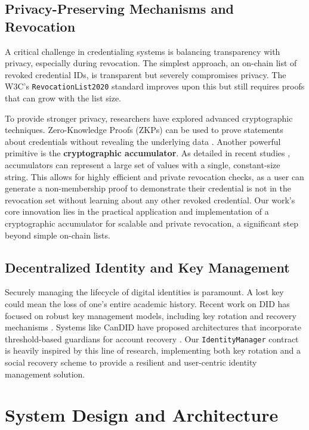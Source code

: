 \documentclass[lettersize,journal]{IEEEtran}
\begin{document}
\subsection{Privacy-Preserving Mechanisms and Revocation}
A critical challenge in credentialing systems is balancing transparency with privacy, especially during revocation. The simplest approach, an on-chain list of revoked credential IDs, is transparent but severely compromises privacy. The W3C's \texttt{RevocationList2020} standard \cite{RevocationList2020} improves upon this but still requires proofs that can grow with the list size.

To provide stronger privacy, researchers have explored advanced cryptographic techniques. Zero-Knowledge Proofs (ZKPs) can be used to prove statements about credentials without revealing the underlying data \cite{ZKP2023}. Another powerful primitive is the \textbf{cryptographic accumulator}. As detailed in recent studies \cite{AccumulatorCrypto2024}, accumulators can represent a large set of values with a single, constant-size string. This allows for highly efficient and private revocation checks, as a user can generate a non-membership proof to demonstrate their credential is not in the revocation set without learning about any other revoked credential. Our work's core innovation lies in the practical application and implementation of a cryptographic accumulator for scalable and private revocation, a significant step beyond simple on-chain lists.

\subsection{Decentralized Identity and Key Management}
Securely managing the lifecycle of digital identities is paramount. A lost key could mean the loss of one's entire academic history. Recent work on DID has focused on robust key management models, including key rotation and recovery mechanisms \cite{KeyManagement2024}. Systems like CanDID have proposed architectures that incorporate threshold-based guardians for account recovery \cite{CanDID2021}. Our \texttt{IdentityManager} contract is heavily inspired by this line of research, implementing both key rotation and a social recovery scheme to provide a resilient and user-centric identity management solution.



\section{System Design and Architecture}
\end{document}
